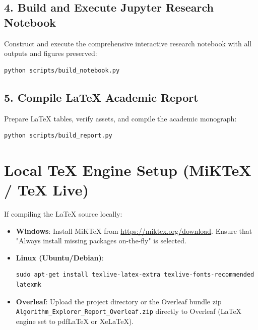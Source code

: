 \subsection{4. Build and Execute Jupyter Research Notebook}
Construct and execute the comprehensive interactive research notebook with all outputs and figures preserved:
\begin{verbatim}
python scripts/build_notebook.py
\end{verbatim}

\subsection{5. Compile LaTeX Academic Report}
Prepare LaTeX tables, verify assets, and compile the academic monograph:
\begin{verbatim}
python scripts/build_report.py
\end{verbatim}

\section{Local TeX Engine Setup (MiKTeX / TeX Live)}
If compiling the LaTeX source locally:
\begin{itemize}
    \item \textbf{Windows}: Install MiKTeX from \url{https://miktex.org/download}. Ensure that "Always install missing packages on-the-fly" is selected.
    \item \textbf{Linux (Ubuntu/Debian)}:
\begin{verbatim}
sudo apt-get install texlive-latex-extra texlive-fonts-recommended latexmk
\end{verbatim}
    \item \textbf{Overleaf}: Upload the project directory or the Overleaf bundle zip \texttt{Algorithm\_Explorer\_Report\_Overleaf.zip} directly to Overleaf (LaTeX engine set to pdfLaTeX or XeLaTeX).
\end{itemize}
